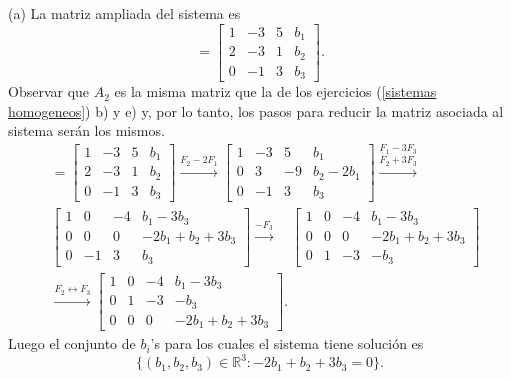 \begin{enumerate}[topsep=6pt, itemsep=.4cm]
(a) La matriz ampliada del sistema es  
\begin{equation*}
[A_2|Y] = \left[\begin{array}{ccc|c}
 1&-3&5&b_1\\
 2&-3&1&b_2\\
 0&-1&3&b_3\end{array}\right] .
\end{equation*}
Observar que $A_2$ es la misma matriz que la de los ejercicios (\ref{sistemas homogeneos}) b) y e) y, por lo tanto, los pasos para reducir la matriz asociada al sistema serán los mismos. 
\begin{align*}
[A_2|Y] &= \left[\begin{array}{ccc|c}
 1&-3&5&b_1\\
 2&-3&1&b_2\\
 0&-1&3&b_3\end{array}\right] \stackrel{F_2-2F_1}{\longrightarrow}   
 \left[\begin{array}{ccc|c}
 1&-3&5&b_1\\
 0&3&-9&b_2-2b_1\\
 0&-1&3&b_3\end{array}\right]\stackrel{F_1-3F_3}{\stackrel{F_2+3F_3}{\longrightarrow}}  \\
 &\left[\begin{array}{ccc|c}
 1&0&-4&b_1-3b_3\\
 0&0&0&-2b_1 +b_2 + 3b_3\\
 0&-1&3&b_3\end{array}\right] 
 {\stackrel{-F_3}{\longrightarrow}}  \quad
 \left[\begin{array}{ccc|c}
 1&0&-4&b_1-3b_3\\
 0&0&0&-2b_1 +b_2 + 3b_3\\
 0&1&-3&-b_3\end{array} \right]
  \\
& {\stackrel{F_2 \leftrightarrow F_3}{\longrightarrow}}   
  \left[\begin{array}{ccc|c}
1&0&-4&b_1-3b_3\\
 0&1&-3&-b_3\\
 0&0&0&-2b_1 +b_2 + 3b_3 \end{array}\right].
\end{align*}
Luego el conjunto de $b_i$'s para los cuales el sistema tiene solución es $$\{(b_1,b_2,b_3)\in \mathbb R^3: -2b_1 +b_2 + 3b_3 = 0\}.$$


\end{enumerate}
